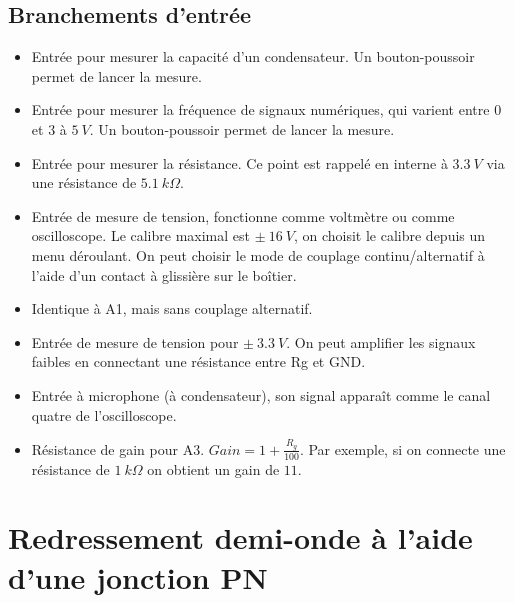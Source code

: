 \documentclass[a4paper,12pt,french]{sphinxmanual}
\begin{document}
\subsection{Branchements d’entrée}
\label{\detokenize{3.0:branchements-d-entree}}\begin{itemize}
\item {} 
 Entrée pour mesurer la capacité d’un condensateur. Un
bouton-poussoir permet de lancer la mesure.

\item {} 
 Entrée pour mesurer la fréquence de signaux numériques, qui
varient entre \(0\) et \(3\) à \(5\ V\).
Un bouton-poussoir permet de lancer la mesure.

\item {} 
 Entrée pour mesurer la résistance. Ce point est rappelé en interne
à \(3.3\ V\) via une résistance de  \(5.1\ k\Omega\).

\item {} 
 Entrée de mesure de tension, fonctionne comme voltmètre ou comme
oscilloscope. Le calibre maximal est \(\pm\ 16\ V\), on choisit
le calibre depuis un menu déroulant. On peut choisir le mode de couplage
continu/alternatif à l’aide d’un contact à glissière sur le boîtier.

\item {} 
 Identique à A1, mais sans couplage alternatif.

\item {} 
 Entrée de mesure de tension pour \(\pm\ 3.3\ V\). On peut
amplifier les signaux faibles en connectant une résistance entre Rg et
GND.

\item {} 
 Entrée à microphone (à condensateur), son signal apparaît comme
le canal quatre de l’oscilloscope.

\item {} 
 Résistance de gain pour A3. \(Gain = 1 + \frac{R_{g}}{100}\).
Par exemple, si on connecte une résistance de \(1\ k\Omega\) on obtient
un gain de \(11\).

\end{itemize}


\section{Redressement demi-onde à l’aide d’une jonction PN}
\label{\detokenize{3.1:redressement-demi-onde-a-laide-dune-jonction-pn}}\label{\detokenize{3.1::doc}}
\end{document}
